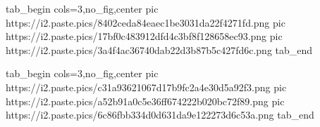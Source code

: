  
 
 
 
 
\zzSecCmtScr

\ifcmt
  tab_begin cols=3,no_fig,center
     pic https://i2.paste.pics/8402ceda84eaec1be3031da22f4271fd.png
		 pic https://i2.paste.pics/17bf0c483912dfd4c3bf8f128658ec93.png
		 pic https://i2.paste.pics/3a4f4ac36740dab22d3b87b5c427fd6c.png
  tab_end
\fi

\ifcmt
  tab_begin cols=3,no_fig,center
		 pic https://i2.paste.pics/c31a93621067d17b9fc2a4e30d5a92f3.png
		 pic https://i2.paste.pics/a52b91a0c5e36ff674222b020bc72f89.png
		 pic https://i2.paste.pics/6c86fbb334d0d631da9e122273d6c53a.png
  tab_end
\fi
